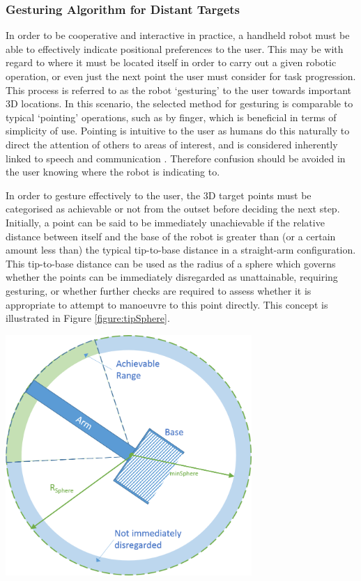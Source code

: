 \documentclass[11pt]{article}
\begin{document}
\subsubsection{Gesturing Algorithm for Distant Targets}
In order to be cooperative and interactive in practice, a handheld robot must be able to effectively indicate positional preferences to the user. This may be with regard to where it must be located itself in order to carry out a given robotic operation, or even just the next point the user must consider for task progression. This process is referred to as the robot `gesturing' to the user towards important 3D locations. In this scenario, the selected method for gesturing is comparable to typical `pointing' operations, such as by finger, which is beneficial in terms of simplicity of use. Pointing is intuitive to the user as humans do this naturally to direct the attention of others to areas of interest, and is considered inherently linked to speech and communication \cite{butterworth2003}. Therefore confusion should be avoided in the user knowing where the robot is indicating to.

In order to gesture effectively to the user, the 3D target points must be categorised as achievable or not from the outset before deciding the next step. Initially, a point can be said to be immediately unachievable if the relative distance between itself and the base of the robot is greater than (or a certain amount less than) the typical tip-to-base distance in a straight-arm configuration. This tip-to-base distance can be used as the radius of a sphere which governs whether the points can be immediately disregarded as unattainable, requiring gesturing, or whether further checks are required to assess whether it is appropriate to attempt to manoeuvre to this point directly. This concept is illustrated in Figure \ref{figure:tipSphere}.

\begin{center}
\includegraphics[width=0.7\textwidth]{images/tipSphere2.png}
\label{figure:tipSphere}
\end{center}
\end{document}
